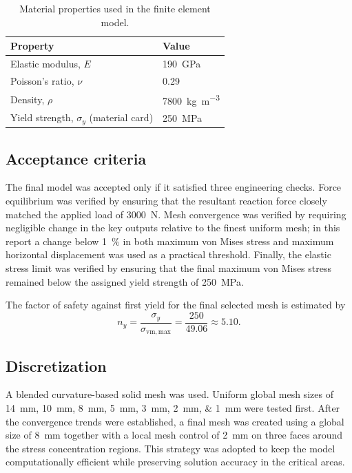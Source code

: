 \documentclass[11pt,a4paper]{article}
\begin{document}
\begin{table}[H]
    \centering
    \caption{Material properties used in the finite element model.}
    \begin{tabular}{ll}
        \toprule
        Property & Value \\
        \midrule
        Elastic modulus, $E$ & \SI{190}{GPa} \\
        Poisson's ratio, $\nu$ & 0.29 \\
        Density, $\rho$ & \SI{7800}{kg.m^{-3}} \\
        Yield strength, $\sigma_y$ (material card) & \SI{250}{MPa} \\
        \bottomrule
    \end{tabular}
    \label{tab:material}
\end{table}

\subsection{Acceptance criteria}
The final model was accepted only if it satisfied three engineering checks. Force equilibrium was verified by ensuring that the resultant reaction force closely matched the applied load of \SI{3000}{N}. Mesh convergence was verified by requiring negligible change in the key outputs relative to the finest uniform mesh; in this report a change below \SI{1}{\percent} in both maximum von Mises stress and maximum horizontal displacement was used as a practical threshold. Finally, the elastic stress limit was verified by ensuring that the final maximum von Mises stress remained below the assigned yield strength of \SI{250}{MPa}.

The factor of safety against first yield for the final selected mesh is estimated by
\begin{equation}
    n_y = \frac{\sigma_y}{\sigma_{\mathrm{vm,max}}} = \frac{250}{49.06} \approx 5.10.
\end{equation}

\subsection{Discretization}
A blended curvature-based solid mesh was used. Uniform global mesh sizes of \SIlist{14;10;8;5;3;2;1}{mm} were tested first. After the convergence trends were established, a final mesh was created using a global size of \SI{8}{mm} together with a local mesh control of \SI{2}{mm} on three faces around the stress concentration regions. This strategy was adopted to keep the model computationally efficient while preserving solution accuracy in the critical areas.
\end{document}
